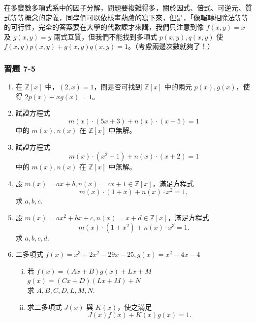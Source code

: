 \begin{example}\label{ex:7-2-9}
在多變數多項式系中的因子分解，問題要複雜得多，關於因式、倍式、可逆元、質式等等概念的定義，同學們可以依樣畫葫蘆的寫下來，但是，「像輾轉相除法等等的可行性，完全的答案要在大學的代數課才來講，我們只注意到像 $f(x, y) = x$ 及 $g(x, y) = y$ 兩式互質，但我們不能找到多項式 $p(x, y), q(x, y)$ 使 $f(x, y)p(x, y)+g(x, y)q(x, y) = 1$。（考慮兩邊次數就夠了！）
\end{example}

\subsubsection*{習題 7-5}\label{sec:ex7-5}

\begin{enumerate}[1.]
  \item 在 $\mathbb{Z}[x]$ 中，$(2, x) = 1$，問是否可找到 $\mathbb{Z}[x]$ 中的兩元 $p(x), g(x)$，使得 $2p(x)+xg(x) = 1$。

  \item 試證方程式
  \begin{equation*}
    m(x) \cdot (5x+3) + n(x) \cdot (x-5) = 1
  \end{equation*}
  中的 $m(x), n(x)$ 在 $\mathbb{Z}[x]$ 中無解。

  \item 試證方程式
  \begin{equation*}
    m(x) \cdot (x^2+1) + n(x) \cdot (x+2) = 1
  \end{equation*}
  中的 $m(x), n(x)$ 在 $\mathbb{Z}[x]$ 中無解。

  \item 設 $m(x) = ax+b, n(x) = cx+1 \in \mathbb{Z}[x]$，滿足方程式
  \begin{equation*}
    m(x) \cdot (1+x) + n(x) \cdot x^2 = 1,
  \end{equation*}
  求 $a, b, c$.

  \item 設 $m(x) = ax^2+bx+c, n(x) = x+d \in \mathbb{Z}[x]$，滿足方程式
  \begin{equation*}
    m(x) \cdot (1+x^2) + n(x) \cdot x^3 = 1.
  \end{equation*}
  求 $a, b, c, d$.

  \item 二多項式 $f(x) = x^3+2x^2-29x-25, g(x) = x^2-4x-4$
  \begin{enumerate}[(i)]
    \item 若 $f(x) = (Ax+B)g(x)+Lx+M$\\
    $g(x) = (Cx+D)(Lx+M)+N$\\
    求 $A, B, C, D, L, M, N$.
    \item 求二多項式 $J(x)$ 與 $K(x)$，使之滿足
    \begin{equation*}
      J(x)f(x)+K(x)g(x) = 1.
    \end{equation*}
  \end{enumerate}
\end{enumerate}

